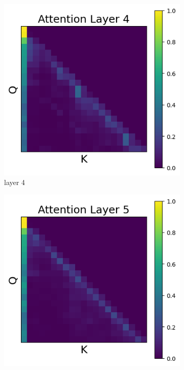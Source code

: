 \documentclass[11pt]{article}
\begin{document}
\begin{figure}[t]
  \begin{subfigure}[t]{0.24\textwidth}
    \centering
    \includegraphics[width=1.4\columnwidth]{figures/intervention4/layer_4.png}
    \caption{layer 4}
    \label{fig:intervention4_layer4}
  \end{subfigure}\hfill
  \begin{subfigure}[t]{0.24\textwidth}
    \centering
    \includegraphics[width=1.4\columnwidth]{figures/intervention4/layer_5.png}

\end{subfigure}
\end{figure}
\end{document}
